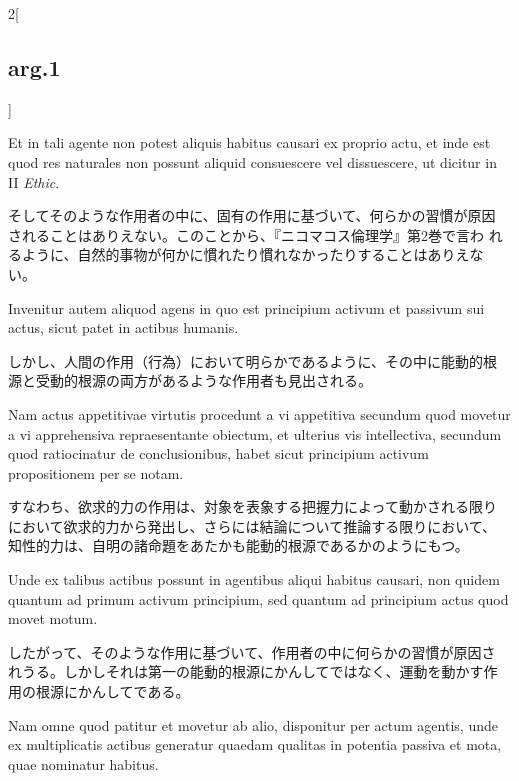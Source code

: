 \documentclass[paper=a4paper,fontsize=10pt,jafontsize=9pt,titlepage]{jlreq}
\begin{document}
\begin{paracol}{2}[\subsection{arg.1}]
\switchcolumn*

Et in tali agente non potest aliquis habitus causari ex proprio actu,
et inde est quod res naturales non possunt aliquid consuescere vel
dissuescere, ut dicitur in II {\itshape Ethic}.

\switchcolumn

そしてそのような作用者の中に、固有の作用に基づいて、何らかの習慣が原因
されることはありえない。このことから、『ニコマコス倫理学』第2巻で言わ
れるように、自然的事物が何かに慣れたり慣れなかったりすることはありえな
い。

\switchcolumn*

Invenitur autem aliquod agens in quo est principium activum et
passivum sui actus, sicut patet in actibus humanis.

\switchcolumn

しかし、人間の作用（行為）において明らかであるように、その中に能動的根
源と受動的根源の両方があるような作用者も見出される。

\switchcolumn*

Nam actus appetitivae virtutis procedunt a vi appetitiva secundum quod
movetur a vi apprehensiva repraesentante obiectum, et ulterius vis
intellectiva, secundum quod ratiocinatur de conclusionibus, habet
sicut principium activum propositionem per se notam.

\switchcolumn

すなわち、欲求的力の作用は、対象を表象する把握力によって動かされる限り
において欲求的力から発出し、さらには結論について推論する限りにおいて、
知性的力は、自明の諸命題をあたかも能動的根源であるかのようにもつ。

\switchcolumn*[\subsection{ad.1}]

Unde ex talibus actibus possunt in agentibus aliqui habitus causari,
non quidem quantum ad primum activum principium, sed quantum ad
principium actus quod movet motum.

\switchcolumn

したがって、そのような作用に基づいて、作用者の中に何らかの習慣が原因さ
れうる。しかしそれは第一の能動的根源にかんしてではなく、運動を動かす作
用の根源にかんしてである。

\switchcolumn*

Nam omne quod patitur et movetur ab alio, disponitur per actum
agentis, unde ex multiplicatis actibus generatur quaedam qualitas in
potentia passiva et mota, quae nominatur habitus.


\end{paracol}
\end{document}
